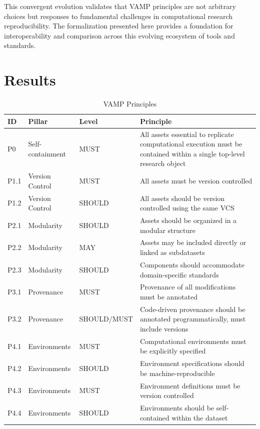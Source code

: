 \documentclass{article}
\begin{document}
This convergent evolution validates that VAMP principles are not arbitrary choices but responses to fundamental challenges in computational research reproducibility.
The formalization presented here provides a foundation for interoperability and comparison across this evolving ecosystem of tools and standards.

\section{Results}

\begin{table}[ht]
\centering
\caption{VAMP Principles}
\begin{tabular}{l l l p{8cm}}
\hline
\textbf{ID} & \textbf{Pillar} & \textbf{Level} & \textbf{Principle} \\
\hline
P0   & Self-containment   & MUST       & All assets essential to replicate computational execution must be contained within a single top-level research object \\
P1.1 & Version Control    & MUST       & All assets must be version controlled \\
P1.2 & Version Control    & SHOULD     & All assets should be version controlled using the same VCS \\
P2.1 & Modularity         & SHOULD     & Assets should be organized in a modular structure \\
P2.2 & Modularity         & MAY        & Assets may be included directly or linked as subdatasets \\
P2.3 & Modularity         & SHOULD     & Components should accommodate domain-specific standards \\
P3.1 & Provenance         & MUST       & Provenance of all modifications must be annotated \\
P3.2 & Provenance         & SHOULD/MUST & Code-driven provenance should be annotated programmatically, must include versions \\
P4.1 & Environments       & MUST       & Computational environments must be explicitly specified \\
P4.2 & Environments       & SHOULD     & Environment specifications should be machine-reproducible \\
P4.3 & Environments       & MUST       & Environment definitions must be version controlled \\
P4.4 & Environments       & SHOULD     & Environments should be self-contained within the dataset \\
\hline
\end{tabular}
\end{table}
\end{document}
